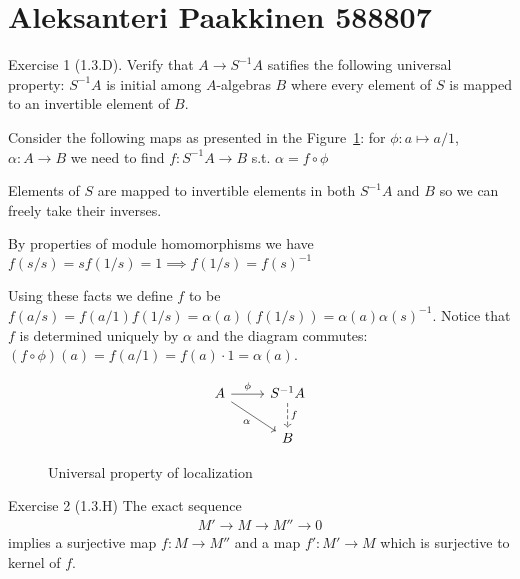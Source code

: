 \documentclass[a4]{article}
\begin{document}
\section*{Aleksanteri Paakkinen 588807}

Exercise 1 (1.3.D).
Verify that $A \rightarrow S^{-1}A$ satifies the following universal property:
$S^{-1}A$ is initial among $A$-algebras $B$ where every element of $S$ is mapped to an
invertible element of $B$.

Consider the following maps as presented in the Figure~\ref{localization}:
for $\phi: a \mapsto a/1$, $\alpha: A \rightarrow B$ we need to find $f: S^{-1}A
\rightarrow B$ s.t. $\alpha = f \circ \phi$

Elements of $S$ are mapped to invertible elements in both $S^{-1}A$ and $B$ so
we can freely take their inverses. %

By properties of module homomorphisms we have $f(s/s) = sf(1/s) = 1 \implies
f(1/s) = f(s)^{-1}$

Using these facts we define $f$ to be
$f(a/s) = f(a/1)f(1/s) = \alpha(a)\left(f(1/s)\right) =
\alpha(a)\alpha(s)^{-1}$. Notice that $f$ is determined uniquely by $\alpha$ and
the diagram commutes: $(f \circ \phi) (a) =
f(a/1) = f(a)\cdot1 = \alpha(a)$.

\begin{figure}[H]
\[\begin{tikzcd}
	A & {S^{-1}A} \\
	& B
	\arrow["\phi", from=1-1, to=1-2]
	\arrow["\alpha"', from=1-1, to=2-2]
	\arrow["f", dashed, from=1-2, to=2-2]
\end{tikzcd}\]
\caption{Universal property of localization}\label{localization}
\end{figure}

Exercise 2 (1.3.H)
The exact sequence
\begin{align}
  M' \rightarrow M \rightarrow M'' \rightarrow 0
\end{align}
implies a surjective map $f: M \rightarrow M''$ and a map $f': M' \rightarrow
M$ which is surjective to kernel of $f$.
\end{document}
